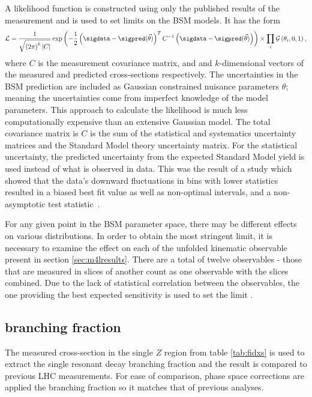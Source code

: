A likelihood function is constructed using only the published results of the measurement and is used to set limits on the BSM models. It has the form
\begin{equation}\label{eq:likelihood}
    \mathcal{L} = \frac{1}{\sqrt{ \left(2\pi\right)^k | C |}} \exp \left( - \frac{1}{2} \left( \sigdata - \sigpred(\vec{\theta}) \right)^T C^{-1} \left(  \sigdata - \sigpred(\vec{\theta})  \right) \right) \times \prod_{i} \mathcal{G}\left(\theta_{i}, 0, 1\right),
\end{equation}
where $C$ is the measurement covariance matrix, and \sigdata and \sigpred $k$-dimensional vectors of the measured and predicted cross-sections respectively. The uncertainties in the BSM prediction are included as Gaussian constrained nuisance parameters $\theta$; meaning the uncertainties come from imperfect knowledge of the model parameters. This approach to calculate the likelihood is much less computationally expensive than an extensive Gaussian model. The total covariance matrix is $C$ is the sum of the statistical and systematics uncertainty matrices and the Standard Model theory uncertainty matrix. For the statistical uncertainty, the predicted uncertainty from the expected Standard Model yield is used instead of what is observed in data. This was the result of a study which showed that the data's downward fluctuations in bins with lower statistics resulted in a biased best fit value as well as non-optimal intervals, and a non-asymptotic test statistic~\cite{m4l_internalnote}. 

For any given point in the BSM parameter space, there may be different effects on various distributions. In order to obtain the most stringent limit, it is necessary to examine the effect on each of the unfolded kinematic observable present in section \ref{sec:m4lresults}. There are a total of twelve observables - those that are measured in slices of another count as one observable with the slices combined. Due to the lack of statistical correlation between the observables, the one providing the best expected sensitivity is used to set the limit \cite{m4l2021_paper}.

\subsection{\ZFourL branching fraction}
The measured cross-section in the single $Z$ region from table \ref{tab:fidxs} is used to extract the single resonant \ZFourL decay branching fraction and the result is compared to previous LHC measurements. For ease of comparison, phase space corrections are applied the branching fraction so it matches that of previous analyses. 

